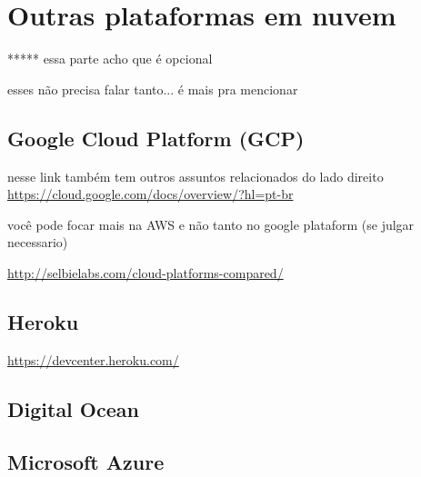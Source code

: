 \chapter{Outras plataformas em nuvem}

***** essa parte acho que é opcional

esses não precisa falar tanto... é mais pra mencionar

\section{Google Cloud Platform (GCP)}

nesse link também tem outros assuntos relacionados do lado direito
\url{https://cloud.google.com/docs/overview/?hl=pt-br}

você pode focar mais na AWS e não tanto no google plataform (se julgar necessario)


\url{http://selbielabs.com/cloud-platforms-compared/}

\section{Heroku}

\url{https://devcenter.heroku.com/}

\section{Digital Ocean}

\section{Microsoft Azure}
